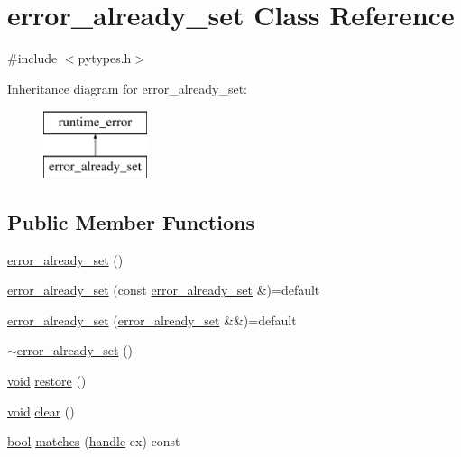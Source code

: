 \hypertarget{classerror__already__set}{}\section{error\+\_\+already\+\_\+set Class Reference}
\label{classerror__already__set}


{\ttfamily \#include $<$pytypes.\+h$>$}

Inheritance diagram for error\+\_\+already\+\_\+set\+:\begin{figure}[H]
\begin{center}
\leavevmode
\includegraphics[height=2.000000cm]{classerror__already__set}
\end{center}
\end{figure}
\subsection*{Public Member Functions}
\begin{DoxyCompactItemize}
\item 
\mbox{\hyperlink{classerror__already__set_a9f6456fb9f03460d943682037132e819}{error\+\_\+already\+\_\+set}} ()
\item 
\mbox{\hyperlink{classerror__already__set_a8bea74f30b56b414ee2629009cb252f4}{error\+\_\+already\+\_\+set}} (const \mbox{\hyperlink{classerror__already__set}{error\+\_\+already\+\_\+set}} \&)=default
\item 
\mbox{\hyperlink{classerror__already__set_a77db6b6c5770db3ec72f6e522375084a}{error\+\_\+already\+\_\+set}} (\mbox{\hyperlink{classerror__already__set}{error\+\_\+already\+\_\+set}} \&\&)=default
\item 
\mbox{\hyperlink{classerror__already__set_a18ad333137ef5b23916ff207a38e9a6a}{$\sim$error\+\_\+already\+\_\+set}} ()
\item 
\mbox{\hyperlink{_s_d_l__opengles2__gl2ext_8h_ae5d8fa23ad07c48bb609509eae494c95}{void}} \mbox{\hyperlink{classerror__already__set_a751b231e5c796447d867cf30007a7fc0}{restore}} ()
\item 
\mbox{\hyperlink{_s_d_l__opengles2__gl2ext_8h_ae5d8fa23ad07c48bb609509eae494c95}{void}} \mbox{\hyperlink{classerror__already__set_a471237e45e4049e9e9ec4bc049621eb1}{clear}} ()
\item 
\mbox{\hyperlink{asdl_8h_af6a258d8f3ee5206d682d799316314b1}{bool}} \mbox{\hyperlink{classerror__already__set_af5fb36e2230179ee533617b55ee90ce2}{matches}} (\mbox{\hyperlink{classhandle}{handle}} ex) const
\end{DoxyCompactItemize}


